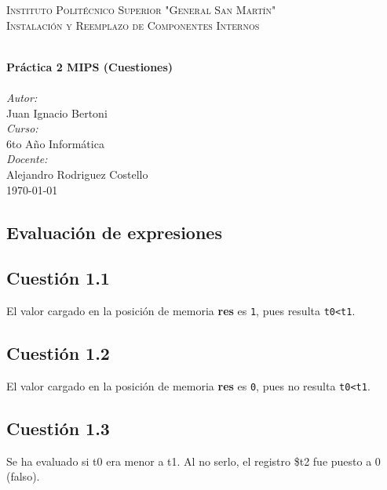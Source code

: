\documentclass[11pt]{article}
\begin{document}
\begin{large}
\begin{titlepage}
\center 
 
\textsc{\LARGE Instituto Politécnico Superior "General San Martín"}\\[1cm]

\textsc{\Large Instalación y Reemplazo de Componentes Internos}\\[0.2cm]				
\vspace{7.5mm}

\HRule \\[0.8cm]
{ \huge \bfseries Práctica 2 MIPS (Cuestiones)}\\[0.7cm]								%
\HRule \\[2cm]
\large
\emph{Autor:}\\
Juan Ignacio Bertoni\\[1.5cm]	
\emph{Curso:}\\
6to Año Informática\\[1.5cm]	
\emph{Docente:}\\
Alejandro Rodriguez Costello\\[1.5cm]	

{\large \today}\\[5cm]
\vfill 
\end{titlepage}



\vfill


\begin{flushleft}

\section*{Evaluación de expresiones}
\subsection*{Cuestión 1.1}

El valor cargado en la posición de memoria \textbf{res} es \texttt{1}, pues resulta \texttt{t0<t1}. 

\subsection*{Cuestión 1.2}
El valor cargado en la posición de memoria \textbf{res} es \texttt{0}, pues no resulta \texttt{t0<t1}. 

\subsection*{Cuestión 1.3}
Se ha evaluado si t0 era menor a t1. Al no serlo, el registro \$t2 fue puesto a 0 (falso).


\end{flushleft}
\end{large}
\end{document}
